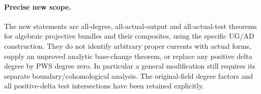 \paragraph{Precise new scope.}
The new statements are all-degree, all-actual-output and
all-actual-test theorems for algebraic projective bundles and their
composites, using the specific UG/AD construction.  They do not
identify arbitrary proper currents with actual forms, supply an
unproved analytic base-change theorem, or replace any positive
delta degree by PWS degree zero.  In particular a general
modification still requires its separate boundary/cohomological
analysis.  The original-field degree factors and all positive-delta
test intersections have been retained explicitly.
